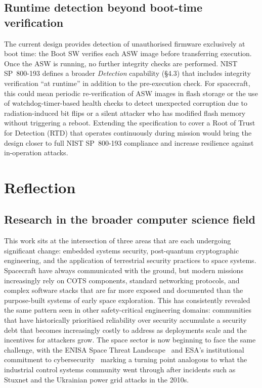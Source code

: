 \subsection{Runtime detection beyond boot-time verification}
\label{subsection:conclusion-futureWork-runtimeDetection}

The current design provides detection of unauthorised firmware exclusively at boot time: the Boot SW verifies each ASW image before transferring execution. Once the ASW is running, no further integrity checks are performed. NIST SP~800-193 \cite{NIST-sp-800-193} defines a broader \emph{Detection} capability (\S4.3) that includes integrity verification ``at runtime'' in addition to the pre-execution check. For spacecraft, this could mean periodic re-verification of ASW images in flash storage or the use of watchdog-timer-based health checks to detect unexpected corruption due to radiation-induced bit flips or a silent attacker who has modified flash memory without triggering a reboot. Extending the specification to cover a Root of Trust for Detection (RTD) that operates continuously during mission would bring the design closer to full NIST SP~800-193 compliance and increase resilience against in-operation attacks.

\section{Reflection}

\subsection{Research in the broader computer science field}

This work sits at the intersection of three areas that are each undergoing significant change: embedded systems security, post-quantum cryptographic engineering, and the application of terrestrial security practices to space systems. Spacecraft have always communicated with the ground, but modern missions increasingly rely on COTS components, standard networking protocols, and complex software stacks that are far more exposed and documented than the purpose-built systems of early space exploration. This has consistently revealed the same pattern seen in other safety-critical engineering domains: communities that have historically prioritised reliability over security accumulate a security debt that becomes increasingly costly to address as deployments scale and the incentives for attackers grow. The space sector is now beginning to face the same challenge, with the ENISA Space Threat Landscape~\cite{enisa_2025} and ESA's institutional commitment to cybersecurity~\cite{ESA_Tech_Strategy_2023, ESA_Cyber_TEC} marking a turning point analogous to what the industrial control systems community went through after incidents such as Stuxnet and the Ukrainian power grid attacks in the 2010s.

